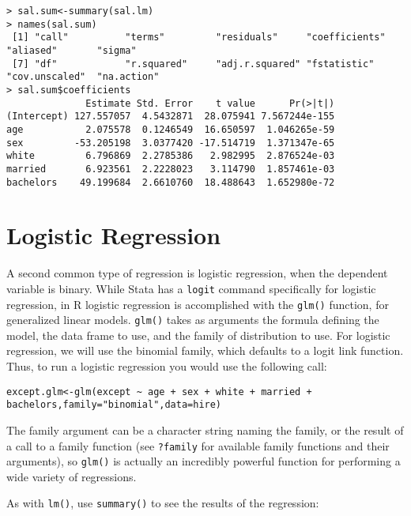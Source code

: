 \documentclass[12pt, oneside]{amsart}   	%
\begin{document}
\begin{verbatim}
> sal.sum<-summary(sal.lm)
> names(sal.sum)
 [1] "call"          "terms"         "residuals"     "coefficients"  "aliased"       "sigma"        
 [7] "df"            "r.squared"     "adj.r.squared" "fstatistic"    "cov.unscaled"  "na.action"    
> sal.sum$coefficients
              Estimate Std. Error    t value      Pr(>|t|)
(Intercept) 127.557057  4.5432871  28.075941 7.567244e-155
age           2.075578  0.1246549  16.650597  1.046265e-59
sex         -53.205198  3.0377420 -17.514719  1.371347e-65
white         6.796869  2.2785386   2.982995  2.876524e-03
married       6.923561  2.2228023   3.114790  1.857461e-03
bachelors    49.199684  2.6610760  18.488643  1.652980e-72
\end{verbatim}

\section{Logistic Regression}

A second common type of regression is logistic regression, when the dependent variable is binary. While Stata has a \texttt{logit} command specifically for logistic regression, in R logistic regression is accomplished with the \texttt{glm()} function, for generalized linear models. \texttt{glm()} takes as arguments the formula defining the model, the data frame to use, and the family of distribution to use. For logistic regression, we will use the binomial family, which defaults to a logit link function. Thus, to run a logistic regression you would use the following call:

\begin{verbatim}
except.glm<-glm(except ~ age + sex + white + married + bachelors,family="binomial",data=hire)
\end{verbatim}

The family argument can be a character string naming the family, or the result of a call to a family function (see \texttt{?family} for available family functions and their arguments), so \texttt{glm()} is actually an incredibly powerful function for performing a wide variety of regressions. 

As with \texttt{lm()}, use \texttt{summary()} to see the results of the regression:
\end{document}
